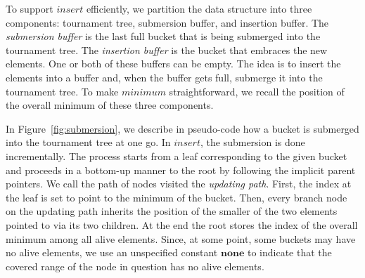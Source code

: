 \documentclass[final,onetabnum,onefignum,onethmnum]{siamltex}
\newcommand{\Minimum}{\mbox{$\mathit{minimum}$}}
\newcommand{\Insert}{\mbox{$\mathit{insert}$}}
\begin{document}
To support \Insert{} efficiently, we partition the data structure into
three components: tournament tree, submersion buffer, and
insertion buffer.  The \emph{submersion buffer} is the last full
bucket that is being submerged into the tournament tree. The
\emph{insertion buffer} is the bucket that embraces the new
elements. One or both of these buffers can be empty. The
idea is to insert the elements into a buffer and, when the buffer gets
full, submerge it into the tournament tree.  To make \Minimum{} 
straightforward, we recall the position of the overall
minimum of these three components.

In Figure~\ref{fig:submersion}, we describe in pseudo-code how a
bucket is submerged into the tournament tree at one go. In \Insert{},
the submersion is done incrementally. The process starts from a leaf
corresponding to the given bucket and proceeds in a bottom-up manner
to the root by following the implicit parent pointers.  We call the
path of nodes visited the \emph{updating path}. First, the index at
the leaf is set to point to the minimum of the bucket. Then, every
branch node on the updating path inherits the position of the smaller
of the two elements pointed to via its two children.  At the end the
root stores the index of the overall minimum among all alive
elements. Since, at some point, some buckets may have no alive elements, 
we use an unspecified constant $\mathbf{none}$ to indicate that the  
covered range of the node in question has no alive elements.
\end{document}
